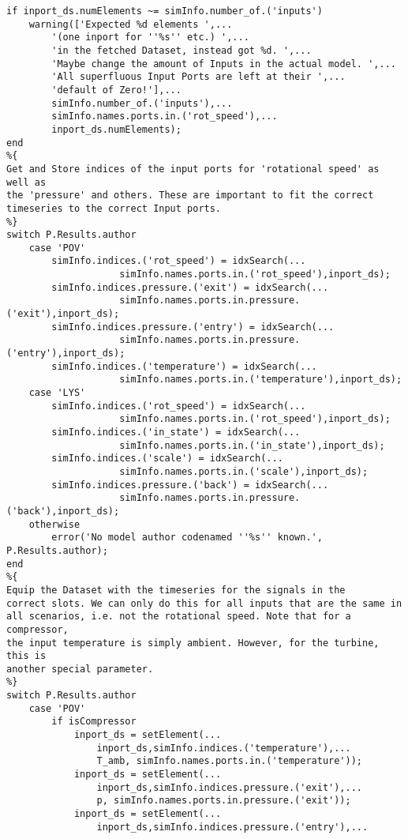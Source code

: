 \begin{lstlisting}
if inport_ds.numElements ~= simInfo.number_of.('inputs')
    warning(['Expected %d elements ',...
        '(one inport for ''%s'' etc.) ',...
        'in the fetched Dataset, instead got %d. ',...
        'Maybe change the amount of Inputs in the actual model. ',...
        'All superfluous Input Ports are left at their ',...
        'default of Zero!'],...
        simInfo.number_of.('inputs'),...
        simInfo.names.ports.in.('rot_speed'),...
        inport_ds.numElements);
end
%{
Get and Store indices of the input ports for 'rotational speed' as well as
the 'pressure' and others. These are important to fit the correct
timeseries to the correct Input ports.
%}
switch P.Results.author
    case 'POV'
        simInfo.indices.('rot_speed') = idxSearch(...
                    simInfo.names.ports.in.('rot_speed'),inport_ds);
        simInfo.indices.pressure.('exit') = idxSearch(...
                    simInfo.names.ports.in.pressure.('exit'),inport_ds);
        simInfo.indices.pressure.('entry') = idxSearch(...
                    simInfo.names.ports.in.pressure.('entry'),inport_ds);
        simInfo.indices.('temperature') = idxSearch(...
                    simInfo.names.ports.in.('temperature'),inport_ds);
    case 'LYS'
        simInfo.indices.('rot_speed') = idxSearch(...
                    simInfo.names.ports.in.('rot_speed'),inport_ds);
        simInfo.indices.('in_state') = idxSearch(...
                    simInfo.names.ports.in.('in_state'),inport_ds);
        simInfo.indices.('scale') = idxSearch(...
                    simInfo.names.ports.in.('scale'),inport_ds);
        simInfo.indices.pressure.('back') = idxSearch(...
                    simInfo.names.ports.in.pressure.('back'),inport_ds); 
    otherwise
        error('No model author codenamed ''%s'' known.', P.Results.author);
end                
%{
Equip the Dataset with the timeseries for the signals in the
correct slots. We can only do this for all inputs that are the same in
all scenarios, i.e. not the rotational speed. Note that for a compressor,
the input temperature is simply ambient. However, for the turbine, this is
another special parameter.
%}
switch P.Results.author
    case 'POV'        
        if isCompressor
            inport_ds = setElement(...
                inport_ds,simInfo.indices.('temperature'),...
                T_amb, simInfo.names.ports.in.('temperature'));
            inport_ds = setElement(...
                inport_ds,simInfo.indices.pressure.('exit'),...
                p, simInfo.names.ports.in.pressure.('exit'));
            inport_ds = setElement(...
                inport_ds,simInfo.indices.pressure.('entry'),...

\end{lstlisting}

